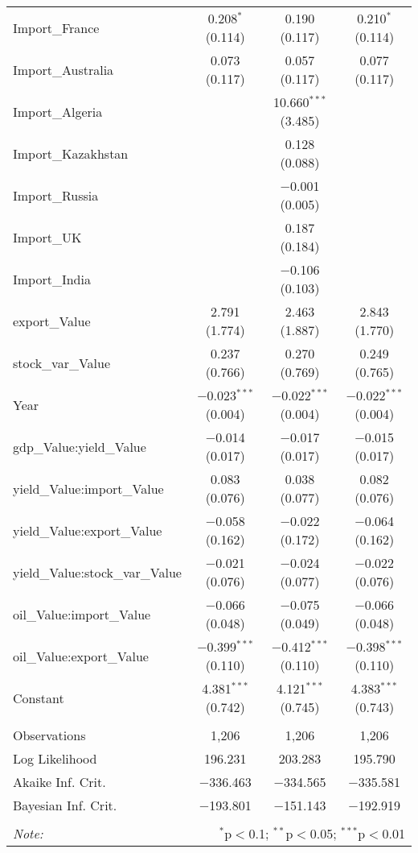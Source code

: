 \begin{table}[H]
\begin{tabular}{@{\extracolsep{5pt}}lccc}
  Import\_France & 0.208$^{*}$ (0.114) & 0.190 (0.117) & 0.210$^{*}$ (0.114) \\ 
  Import\_Australia & 0.073 (0.117) & 0.057 (0.117) & 0.077 (0.117) \\ 
  Import\_Algeria &  & 10.660$^{***}$ (3.485) &  \\ 
  Import\_Kazakhstan &  & 0.128 (0.088) &  \\ 
  Import\_Russia &  & $-$0.001 (0.005) &  \\ 
  Import\_UK &  & 0.187 (0.184) &  \\ 
  Import\_India &  & $-$0.106 (0.103) &  \\ 
  export\_Value & 2.791 (1.774) & 2.463 (1.887) & 2.843 (1.770) \\ 
  stock\_var\_Value & 0.237 (0.766) & 0.270 (0.769) & 0.249 (0.765) \\ 
  Year & $-$0.023$^{***}$ (0.004) & $-$0.022$^{***}$ (0.004) & $-$0.022$^{***}$ (0.004) \\ 
  gdp\_Value:yield\_Value & $-$0.014 (0.017) & $-$0.017 (0.017) & $-$0.015 (0.017) \\ 
  yield\_Value:import\_Value & 0.083 (0.076) & 0.038 (0.077) & 0.082 (0.076) \\ 
  yield\_Value:export\_Value & $-$0.058 (0.162) & $-$0.022 (0.172) & $-$0.064 (0.162) \\ 
  yield\_Value:stock\_var\_Value & $-$0.021 (0.076) & $-$0.024 (0.077) & $-$0.022 (0.076) \\ 
  oil\_Value:import\_Value & $-$0.066 (0.048) & $-$0.075 (0.049) & $-$0.066 (0.048) \\ 
  oil\_Value:export\_Value & $-$0.399$^{***}$ (0.110) & $-$0.412$^{***}$ (0.110) & $-$0.398$^{***}$ (0.110) \\ 
  Constant & 4.381$^{***}$ (0.742) & 4.121$^{***}$ (0.745) & 4.383$^{***}$ (0.743) \\ 
 \hline \\[-1.8ex] 
Observations & 1,206 & 1,206 & 1,206 \\ 
Log Likelihood & 196.231 & 203.283 & 195.790 \\ 
Akaike Inf. Crit. & $-$336.463 & $-$334.565 & $-$335.581 \\ 
Bayesian Inf. Crit. & $-$193.801 & $-$151.143 & $-$192.919 \\ 
\hline 
\hline \\[-1.8ex] 
\textit{Note:}  & \multicolumn{3}{r}{$^{*}$p$<$0.1; $^{**}$p$<$0.05; $^{***}$p$<$0.01} \\ 
\end{tabular} 
\end{table} 
